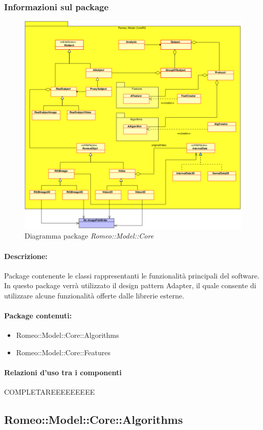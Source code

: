 		\subsubsection{Informazioni sul package}
			\begin{figure}[!h]
				\centering
				\includegraphics[scale=0.5]{./Content/Immagini/Romeo__Model__Core.png}
				\caption{Diagramma package \textsl{Romeo::Model::Core}}
			\end{figure}
			\paragraph{Descrizione:}Package\g{} contenente le classi rappresentanti le funzionalità principali del software. In questo package\g{} verrà utilizzato il design pattern\g{} Adapter, il quale consente di utilizzare alcune funzionalità offerte dalle librerie esterne.
			\paragraph{Package contenuti:}
				\begin{itemize}
					\item Romeo::Model::Core::Algorithms
					\item Romeo::Model::Core::Features
				\end{itemize}
			\paragraph{Relazioni d'uso tra i componenti}
COMPLETAREEEEEEEEE	\subsection{Romeo::Model::Core::Algorithms}
